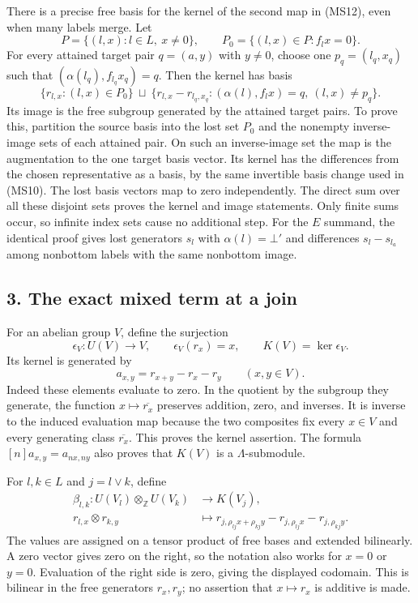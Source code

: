 \documentclass[
]{article}
\newcounter{none} %
\begin{document}
There is a precise free basis for the kernel of the second map in
(MS12), even when many labels merge. Let \[
P=\{(l,x):l\in L,\ x\ne0\},\qquad
P_0=\{(l,x)\in P:f_lx=0\}.
\tag{MS13}
\] For every attained target pair \(q=(a,y)\) with \(y\ne0\), choose one
\(p_q=(l_q,x_q)\) such that \((\alpha(l_q),f_{l_q}x_q)=q\). Then the
kernel has basis \[
\{r_{l,x}:(l,x)\in P_0\}
\ \sqcup\
\{r_{l,x}-r_{l_q,x_q}:
 (\alpha(l),f_lx)=q,\ (l,x)\ne p_q\}.
\tag{MS14}
\] Its image is the free subgroup generated by the attained target
pairs. To prove this, partition the source basis into the lost set
\(P_0\) and the nonempty inverse-image sets of each attained pair. On
such an inverse-image set the map is the augmentation to the one target
basis vector. Its kernel has the differences from the chosen
representative as a basis, by the same invertible basis change used in
(MS10). The lost basis vectors map to zero independently. The direct sum
over all these disjoint sets proves the kernel and image statements.
Only finite sums occur, so infinite index sets cause no additional step.
For the \(E\) summand, the identical proof gives lost generators \(s_l\)
with \(\alpha(l)=\bot'\) and differences \(s_l-s_{l_a}\) among nonbottom
labels with the same nonbottom image.

\subsection{3. The exact mixed term at a
join}\label{the-exact-mixed-term-at-a-join}

For an abelian group \(V\), define the surjection \[
\epsilon_V:U(V)\to V,\qquad \epsilon_V(r_x)=x,
\qquad K(V)=\ker\epsilon_V.
\tag{MS15}
\] Its kernel is generated by \[
a_{x,y}=r_{x+y}-r_x-r_y\qquad(x,y\in V).
\tag{MS16}
\] Indeed these elements evaluate to zero. In the quotient by the
subgroup they generate, the function \(x\mapsto\overline{r_x}\)
preserves addition, zero, and inverses. It is inverse to the induced
evaluation map because the two composites fix every \(x\in V\) and every
generating class \(\overline{r_x}\). This proves the kernel assertion.
The formula \([n]a_{x,y}=a_{nx,ny}\) also proves that \(K(V)\) is a
\(\Lambda\)-submodule.

For \(l,k\in L\) and \(j=l\vee k\), define \[
\begin{split}
\beta_{l,k}:U(V_l)\otimes_{\mathbb Z}U(V_k)&\longrightarrow K(V_j),\\
r_{l,x}\otimes r_{k,y}&\longmapsto
r_{j,\rho_{lj}x+\rho_{kj}y}
-r_{j,\rho_{lj}x}-r_{j,\rho_{kj}y}.
\end{split}
\tag{MS17}
\] The values are assigned on a tensor product of free bases and
extended bilinearly. A zero vector gives zero on the right, so the
notation also works for \(x=0\) or \(y=0\). Evaluation of the right side
is zero, giving the displayed codomain. This is bilinear in the free
generators \(r_x,r_y\); no assertion that \(x\mapsto r_x\) is additive
is made.
\end{document}
